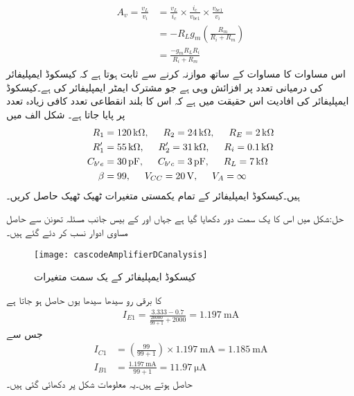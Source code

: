 \begin{gather}
\begin{aligned}
A_v=\frac{v_L}{v_i}&=\frac{v_L}{i_c} \times \frac{i_c}{v_{be1}} \times \frac{v_{be1}}{v_i}\\
&=-R_L g_{m} \left(\frac{R_m}{R_i+R_m}\right)\\
&=\frac{-g_m R_L R_i}{R_i +R_m}
\end{aligned}
\end{gather}
اس مساوات کا مساوات  کے ساتھ موازنہ کرنے سے ثابت ہوتا ہے کہ کیسکوڈ ایمپلیفائر کی درمیانی تعدد پر افزائش وہی ہے جو مشترک ایمٹر ایمپلیفائر کی ہے۔کیسکوڈ ایمپلیفائر کی افادیت اس حقیقت میں ہے کہ اس کا بلند انقطاعی تعدد کافی زیادہ تعدد پر پایا جاتا ہے۔
شکل  الف میں
\begin{align*}
R_1&=\SI{120}{\kilo \ohm}, \hspace{5mm} R_2=\SI{24}{\kilo \ohm}, \hspace{5mm} R_E=\SI{2}{\kilo \ohm}\\
R_1'&=\SI{55}{\kilo \ohm}, \hspace{5mm} R_2'=\SI{31}{\kilo \ohm}, \hspace{5mm} R_i=\SI{0.1}{\kilo \ohm}\\
C_{b'e}&=\SI{30}{\pico \farad}, \hspace{5mm} C_{b'c}=\SI{3}{\pico \farad}, \hspace{5mm} R_L=\SI{7}{\kilo \ohm} \\
\beta&=99, \hspace{5mm} V_{CC}=\SI{20}{\volt}, \hspace{5mm} V_A=\infty 
\end{align*}
ہیں۔کیسکوڈ ایمپلیفائر کے تمام یکمستی متغیرات ٹھیک ٹھیک حاصل کریں۔

حل:شکل  میں اس کا یک سمت  دور دکھایا گیا ہے جہاں  اور  کے بیس  جانب مسئلہ تھونن  سے حاصل مساوی ادوار نسب کر دئے گئے ہیں۔
\begin{figure}
\centering
\texttt{[image: cascodeAmplifierDCanalysis]}
\caption{کیسکوڈ ایمپلیفائر کے یک سمت  متغیرات}
\label{شکل_تعددی_ردعمل_کیسکوڈ_ایمپلیفائر_یکسمتی_متغیرات}
\end{figure}

 کا برقی رو سیدھا سیدھا یوں حاصل ہو جاتا ہے
\begin{align}\label{مساوات_تعددی_ردعمل_کیسکوڈ_پہلی_برقی_رو}
I_{E1}=\frac{3.333-0.7}{\frac{20000}{99+1}+2000}=\SI{1.197}{\milli \ampere}
\end{align}
جس سے
\begin{align*}
I_{C1}&=\left(\frac{99}{99+1}\right) \times \SI{1.197}{\milli \ampere}=\SI{1.185}{\milli \ampere}\\
I_{B1}&=\frac{\SI{1.197}{\milli \ampere}}{99+1}=\SI{11.97}{\micro \ampere}
\end{align*}
حاصل ہوتے ہیں۔یہ معلومات شکل پر دکھائی گئی ہیں۔

